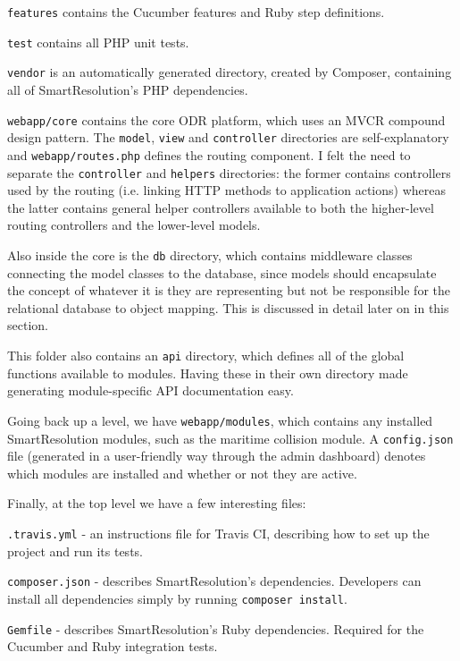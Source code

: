 \lstinline{features} contains the Cucumber features and Ruby step definitions.

\lstinline{test} contains all PHP unit tests.

\lstinline{vendor} is an automatically generated directory, created by Composer, containing all of SmartResolution's PHP dependencies.

\lstinline{webapp/core} contains the core ODR platform, which uses an MVCR compound design pattern. The \lstinline{model}, \lstinline{view} and \lstinline{controller} directories are self-explanatory and \lstinline{webapp/routes.php} defines the routing component. I felt the need to separate the \lstinline{controller} and \lstinline{helpers} directories: the former contains controllers used by the routing (i.e. linking HTTP methods to application actions) whereas the latter contains general helper controllers available to both the higher-level routing controllers and the lower-level models.

Also inside the core is the \lstinline{db} directory, which contains middleware classes connecting the model classes to the database, since models should encapsulate the concept of whatever it is they are representing but not be responsible for the relational database to object mapping. This is discussed in detail later on in this section.

This folder also contains an \lstinline{api} directory, which defines all of the global functions available to modules. Having these in their own directory made generating module-specific API documentation easy.

Going back up a level, we have \lstinline{webapp/modules}, which contains any installed SmartResolution modules, such as the maritime collision module. A \lstinline{config.json} file (generated in a user-friendly way through the admin dashboard) denotes which modules are installed and whether or not they are active.

Finally, at the top level we have a few interesting files:

\lstinline{.travis.yml} - an instructions file for Travis CI, describing how to set up the project and run its tests.

\lstinline{composer.json} - describes SmartResolution's dependencies. Developers can install all dependencies simply by running \lstinline{composer install}.

\lstinline{Gemfile} - describes SmartResolution's Ruby dependencies. Required for the Cucumber and Ruby integration tests.

